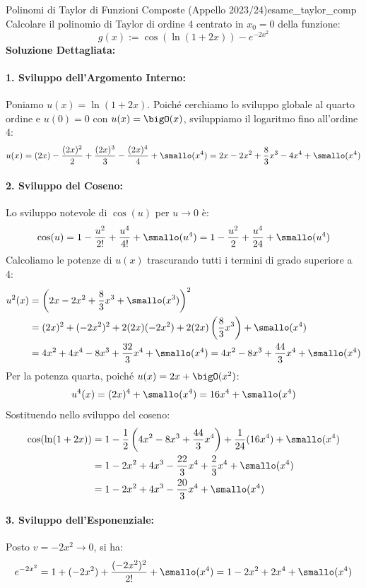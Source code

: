 \begin{esempio}{Polinomi di Taylor di Funzioni Composte (Appello 2023/24)}{esame_taylor_comp}
Calcolare il polinomio di Taylor di ordine 4 centrato in $x_0 = 0$ della funzione:
\[
    g(x) := \cos(\ln(1 + 2x)) - e^{-2x^2}
\]
\tcblower
\textbf{Soluzione Dettagliata:}

\paragraph{1. Sviluppo dell'Argomento Interno:}
Poniamo $u(x) = \ln(1 + 2x)$. Poiché cerchiamo lo sviluppo globale al quarto ordine e $u(0) = 0$ con $u(x) = \bigO(x)$, sviluppiamo il logaritmo fino all'ordine 4:
\[
    u(x) = (2x) - \frac{(2x)^2}{2} + \frac{(2x)^3}{3} - \frac{(2x)^4}{4} + \smallo(x^4) = 2x - 2x^2 + \frac{8}{3}x^3 - 4x^4 + \smallo(x^4)
\]

\paragraph{2. Sviluppo del Coseno:}
Lo sviluppo notevole di $\cos(u)$ per $u \to 0$ è:
\[
    \cos(u) = 1 - \frac{u^2}{2!} + \frac{u^4}{4!} + \smallo(u^4) = 1 - \frac{u^2}{2} + \frac{u^4}{24} + \smallo(u^4)
\]
Calcoliamo le potenze di $u(x)$ trascurando tutti i termini di grado superiore a 4:
\begin{align*}
    u^2(x) &= \left(2x - 2x^2 + \frac{8}{3}x^3 + \smallo(x^3)\right)^2 \\
    &= (2x)^2 + (-2x^2)^2 + 2(2x)(-2x^2) + 2(2x)\left(\frac{8}{3}x^3\right) + \smallo(x^4) \\
    &= 4x^2 + 4x^4 - 8x^3 + \frac{32}{3}x^4 + \smallo(x^4) = 4x^2 - 8x^3 + \frac{44}{3}x^4 + \smallo(x^4)
\end{align*}
Per la potenza quarta, poiché $u(x) = 2x + \bigO(x^2)$:
\[
    u^4(x) = (2x)^4 + \smallo(x^4) = 16x^4 + \smallo(x^4)
\]
Sostituendo nello sviluppo del coseno:
\begin{align*}
    \cos(\ln(1 + 2x)) &= 1 - \frac{1}{2}\left(4x^2 - 8x^3 + \frac{44}{3}x^4\right) + \frac{1}{24}(16x^4) + \smallo(x^4) \\
    &= 1 - 2x^2 + 4x^3 - \frac{22}{3}x^4 + \frac{2}{3}x^4 + \smallo(x^4) \\
    &= 1 - 2x^2 + 4x^3 - \frac{20}{3}x^4 + \smallo(x^4)
\end{align*}

\paragraph{3. Sviluppo dell'Esponenziale:}
Posto $v = -2x^2 \to 0$, si ha:
\[
    e^{-2x^2} = 1 + (-2x^2) + \frac{(-2x^2)^2}{2!} + \smallo(x^4) = 1 - 2x^2 + 2x^4 + \smallo(x^4)
\]


\end{esempio}

